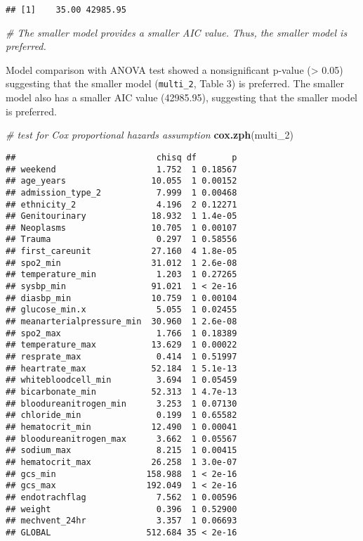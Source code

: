 \documentclass[
]{article}
\newenvironment{Shaded}{\begin{snugshade}}{\end{snugshade}}
\newcommand{\CommentTok}[1]{\textcolor[rgb]{0.56,0.35,0.01}{\textit{#1}}}
\newcommand{\FunctionTok}[1]{\textcolor[rgb]{0.13,0.29,0.53}{\textbf{#1}}}
\newcommand{\NormalTok}[1]{#1}
\begin{document}
\begin{verbatim}
## [1]    35.00 42985.95
\end{verbatim}

\begin{Shaded}
\begin{Highlighting}[]
\CommentTok{\# The smaller model provides a smaller AIC value. Thus, the smaller model is preferred.}
\end{Highlighting}
\end{Shaded}

Model comparison with ANOVA test showed a nonsignificant p-value
(\textgreater{} 0.05) suggesting that the smaller model
(\texttt{multi\_2}, Table 3) is preferred. The smaller model also has a
smaller AIC value (42985.95), suggesting that the smaller model is
preferred.

\begin{Shaded}
\begin{Highlighting}[]
\CommentTok{\# test for Cox proportional hazards assumption}
\FunctionTok{cox.zph}\NormalTok{(multi\_2)}
\end{Highlighting}
\end{Shaded}

\begin{verbatim}
##                            chisq df       p
## weekend                    1.752  1 0.18567
## age_years                 10.055  1 0.00152
## admission_type_2           7.999  1 0.00468
## ethnicity_2                4.196  2 0.12271
## Genitourinary             18.932  1 1.4e-05
## Neoplasms                 10.705  1 0.00107
## Trauma                     0.297  1 0.58556
## first_careunit            27.160  4 1.8e-05
## spo2_min                  31.012  1 2.6e-08
## temperature_min            1.203  1 0.27265
## sysbp_min                 91.021  1 < 2e-16
## diasbp_min                10.759  1 0.00104
## glucose_min.x              5.055  1 0.02455
## meanarterialpressure_min  30.960  1 2.6e-08
## spo2_max                   1.766  1 0.18389
## temperature_max           13.629  1 0.00022
## resprate_max               0.414  1 0.51997
## heartrate_max             52.184  1 5.1e-13
## whitebloodcell_min         3.694  1 0.05459
## bicarbonate_min           52.313  1 4.7e-13
## bloodureanitrogen_min      3.253  1 0.07130
## chloride_min               0.199  1 0.65582
## hematocrit_min            12.490  1 0.00041
## bloodureanitrogen_max      3.662  1 0.05567
## sodium_max                 8.215  1 0.00415
## hematocrit_max            26.258  1 3.0e-07
## gcs_min                  158.988  1 < 2e-16
## gcs_max                  192.049  1 < 2e-16
## endotrachflag              7.562  1 0.00596
## weight                     0.396  1 0.52900
## mechvent_24hr              3.357  1 0.06693
## GLOBAL                   512.684 35 < 2e-16
\end{verbatim}
\end{document}
